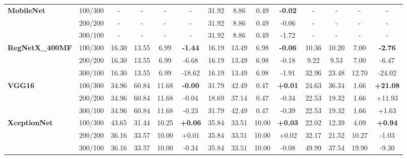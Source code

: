 \begin{table}[htbp]
{\begin{tabular}{@{}ll | cccc | cccc | cccc@{}}
\midrule
\multirow{3}{*}{\textbf{MobileNet}} & 100/300 & - & - & - & - & 31.92 & 8.86 & 0.49 & \textbf{-0.02} & - & - & - & - \\
 & 200/200 & - & - & - & - & 31.92 & 8.86 & 0.49 & -0.06 & - & - & - & - \\
 & 300/100 & - & - & - & - & 31.92 & 8.86 & 0.49 & -1.72 & - & - & - & - \\
\midrule
\multirow{3}{*}{\textbf{RegNetX\_400MF}} & 100/300 & 16.30 & 13.55 & 6.99 & \textbf{-1.44} & 16.19 & 13.49 & 6.98 & \textbf{-0.06} & 10.36 & 10.20 & 7.00 & \textbf{-2.76} \\
 & 200/200 & 16.30 & 13.55 & 6.99 & -6.68 & 16.19 & 13.49 & 6.98 & -0.18 & 9.22 & 9.53 & 7.00 & -6.47 \\
 & 300/100 & 16.30 & 13.55 & 6.99 & -18.62 & 16.19 & 13.49 & 6.98 & -1.91 & 32.96 & 23.48 & 12.70 & -24.02 \\
\midrule
\multirow{3}{*}{\textbf{VGG16}} & 100/300 & 34.96 & 60.84 & 11.68 & \textbf{-0.00} & 31.79 & 42.49 & 0.47 & \textbf{+0.01} & 24.63 & 36.34 & 1.66 & \textbf{+21.08} \\
 & 200/200 & 34.96 & 60.84 & 11.68 & -0.04 & 18.69 & 37.14 & 0.47 & -0.34 & 22.53 & 19.32 & 1.66 & +11.93 \\
 & 300/100 & 34.96 & 60.84 & 11.68 & -0.23 & 31.79 & 42.49 & 0.47 & -0.39 & 22.53 & 19.32 & 1.66 & +1.63 \\
\midrule
\multirow{3}{*}{\textbf{XceptionNet}} & 100/300 & 43.65 & 31.44 & 10.25 & \textbf{+0.06} & 35.84 & 33.51 & 10.00 & \textbf{+0.03} & 22.02 & 12.39 & 4.09 & \textbf{+0.94} \\
 & 200/200 & 36.16 & 33.57 & 10.00 & +0.01 & 35.84 & 33.51 & 10.00 & +0.02 & 32.17 & 21.52 & 10.27 & -1.03 \\
 & 300/100 & 36.16 & 33.57 & 10.00 & -0.34 & 35.84 & 33.51 & 10.00 & -0.08 & 49.99 & 37.54 & 19.90 & -9.30 \\
\bottomrule
\end{tabular}
}
\end{table}